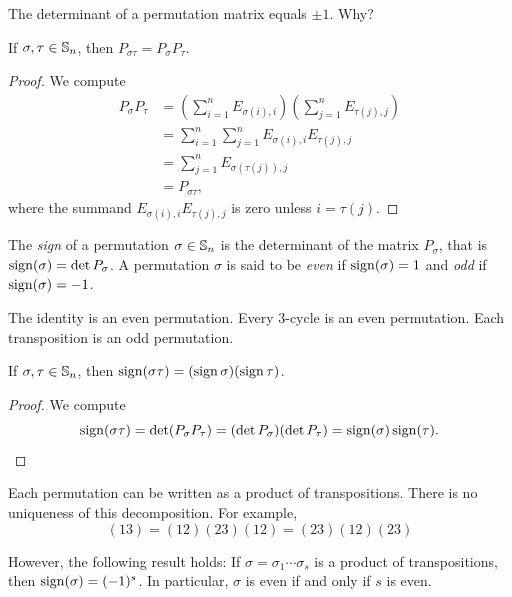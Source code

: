 The determinant of a permutation matrix equals 
$\pm1$. Why? 

\begin{proposition}
If $\sigma,\tau\in\mathbb{S}_n$, then $P_{\sigma\tau}=P_\sigma P_\tau$.
\end{proposition}

\begin{proof}
We compute 
\begin{align*}
P_\sigma P_\tau &=\left(\sum_{i=1}^n E_{\sigma(i),i}\right)\left(\sum_{j=1}^nE_{\tau{(j)},j}\right)\\
&=\sum_{i=1}^n\sum_{j=1}^n E_{\sigma(i),i}E_{\tau(j),j}\\
&=\sum_{j=1}^n E_{\sigma(\tau(j)),j}\\
&=P_{\sigma\tau},
\end{align*}
where the summand $E_{\sigma(i),i}E_{\tau(j),j}$ is zero unless $i=\tau(j)$. 
\end{proof}


\begin{definition}
    The \emph{sign} of a permutation $\sigma\in\mathbb{S}_n$ 
    is the 
    determinant of the matrix 
    $P_\sigma$, that is $\operatorname{sign}(\sigma)=\det P_\sigma$.
    A permutation $\sigma$ is said to be \emph{even} if $\operatorname{sign}(\sigma)=1$ and \emph{odd} if $\operatorname{sign}(\sigma)=-1$.
\end{definition}

The identity is an even permutation. Every 3-cycle is
an even permutation. Each transposition is an odd permutation. 

\begin{proposition}
If $\sigma,\tau\in\mathbb{S}_n$, then $\operatorname{sign}(\sigma\tau)=(\operatorname{sign}\sigma)(\operatorname{sign}\tau)$.
\end{proposition}

\begin{proof}
        We compute 
        \[
        \operatorname{sign}(\sigma\tau)=\det(P_\sigma P_\tau)=(\det P_\sigma)(\det P_\tau)=\operatorname{sign}(\sigma)\operatorname{sign}(\tau).\qedhere
        \]
\end{proof}

Each permutation can be written as a product of transpositions. 
There is no uniqueness of this decomposition. For example, 
\[
(13)=(12)(23)(12)=(23)(12)(23)
\]

However, the following result holds: If 
$\sigma=\sigma_1\cdots\sigma_s$ is a product of transpositions, 
then $\operatorname{sign}(\sigma)=(-1)^s$.
In particular, $\sigma$ is even if and only if
$s$ is even. 



